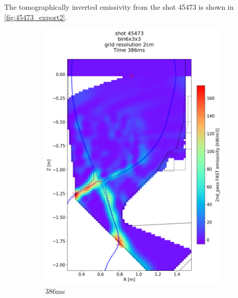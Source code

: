 The tomographically inverted emissivity from the shot 45473 is shown in \autoref{fig:45473_export2}.
\begin{figure}
     \centering
     \begin{subfigure}{0.395\linewidth}
         \centering
         \includegraphics[trim={75 90 0 190},clip,width=\textwidth]{Chapters/chapter2/figs/IRVB-MASTU_shot-45473_export_72.png}
         \vspace*{-6.5mm}
         \caption{386ms}
         \label{fig:45473_export2_1}
     \end{subfigure}
     \begin{subfigure}{0.395\linewidth}
         \centering

\end{subfigure}
\end{figure}
